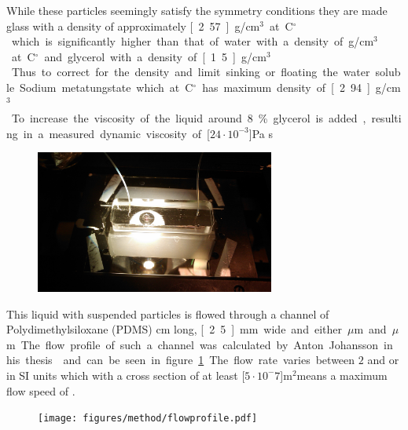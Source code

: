 While these particles seemingly satisfy the symmetry conditions they are made glass with a density of approximately \unit[2.57]{g/cm$^3$} at \unit[20]{C$^\circ$} which is significantly higher than that of water with a density of \unit[1]{g/cm$^3$} at \unit[20]{C$^\circ$} and glycerol with a density of \unit[1.5]{g/cm$^3$}. Thus to correct for the density and limit sinking or floating the water soluble Sodium metatungstate which at \unit[20]{C$^\circ$} has maximum density of \unit[2.94]{g/cm$^3$}. To increase the viscosity of the liquid around 8\% glycerol is added, resulting in a measured dynamic viscosity of \unit[$24\cdot 10^{-3}$]{Pa s}

\begin{figure}[H]
\centering
\includegraphics[width=0.7\textwidth]{figures/method/ChannelZoomed.jpg}
\end{figure}


This liquid with suspended particles is flowed through a channel of Polydimethylsiloxane (PDMS) \unit[4]{cm} long,
 \unit[2.5]{mm} wide and either \unit[200]{$\mu$m} and \unit[500]{$\mu$m}. The flow profile of such a channel was 
 calculated by Anton Johansson in his thesis\cite{AntonThesis} and can be seen in figure \ref{fig:flowprofile}. The 
 flow rate varies  between $2$ and  or in SI units  
 which with a cross section of at least \unit[$5\cdot 10^-7$]{m$^2$}means a maximum flow speed of  
 .

\begin{figure}[H]
\begin{center}
\texttt{[image: figures/method/flowprofile.pdf]}
\end{center}
\caption{}
\label{fig:flowprofile}
\end{figure}

